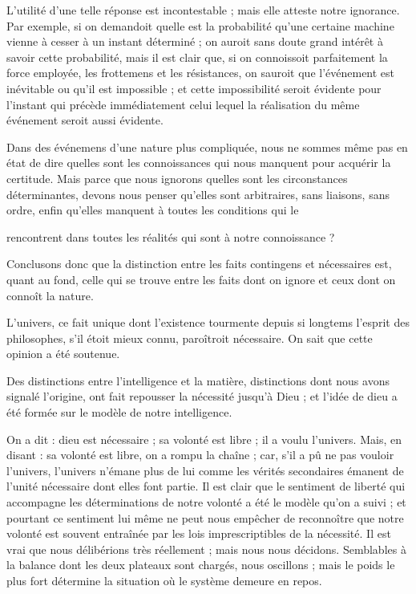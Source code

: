 \documentclass[11pt,a4paper]{article}
\begin{document}
L'utilité d'une telle réponse est incontestable ; mais elle atteste notre
ignorance. Par exemple, si on demandoit quelle est la probabilité qu'une
certaine machine vienne à cesser à  un instant déterminé ;
on auroit sans doute grand intérêt à  savoir
cette probabilité, mais il est clair que, si on connoissoit parfaitement
la force employée, les frottemens et les résistances, on
 sauroit que l'événement est inévitable ou qu'il est
impossible ; et cette impossibilité seroit évidente pour l'instant qui
précède immédiatement celui  lequel la réalisation du même
événement seroit aussi évidente.

Dans des événemens d'une nature plus compliquée, nous ne sommes même pas
en état de dire quelles sont les connoissances qui nous manquent pour
acquérir la certitude. Mais parce que nous ignorons quelles sont les
circonstances déterminantes, devons nous penser qu'elles sont
arbitraires, sans liaisons, sans ordre, enfin qu'elles manquent à toutes
les conditions qui  le

\struck{\ill{}} rencontrent dans toutes les réalités qui sont à notre
connoissance ?

Conclusons donc que la distinction entre les faits contingens et
nécessaires est, quant au fond, celle qui se trouve entre les faits dont
on ignore et ceux dont on connoît la nature.

L'univers, ce fait unique dont l'existence tourmente depuis si longtems
l'esprit des philosophes, s'il étoit mieux connu, paroîtroit nécessaire.
On sait que cette opinion a été soutenue.

Des distinctions entre l'intelligence et la matière, distinctions dont
nous avons signalé l'origine, ont fait  repousser la
nécessité jusqu'à Dieu ; et l'idée de dieu  a été
formée sur le modèle de notre intelligence.

On a dit : dieu est nécessaire ; sa volonté est libre ; il a voulu
l'univers. Mais, en disant : sa volonté est libre, on a rompu la chaîne ;
car, s'il a pû ne pas vouloir l'univers, l'univers n'émane plus de lui
comme les vérités secondaires émanent de l'unité nécessaire dont elles
font partie. Il est clair que le sentiment de liberté qui accompagne les
déterminations de notre volonté a été le modèle qu'on a suivi ; et
pourtant ce sentiment lui même ne peut nous empêcher de reconnoître que
notre volonté est souvent entraînée par les lois imprescriptibles de la
nécessité. Il est vrai que nous délibérions très réellement ; mais nous
nous décidons. Semblables à la balance dont les deux plateaux sont
chargés, nous  oscillons ; mais le poids le plus fort
détermine la situation où le système  demeure en
repos.
\end{document}
